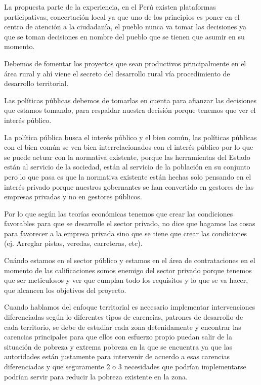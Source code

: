 \documentclass[
  a4paper,
]{article}
\begin{document}
La propuesta parte de la experiencia, en el Perú existen plataformas
participativas, concertación local ya que uno de los principios es poner
en el centro de atención a la ciudadanía, el pueblo nunca va tomar las
decisiones ya que se toman decisiones en nombre del pueblo que se tienen
que asumir en su momento.

Debemos de fomentar los proyectos que sean productivos principalmente en
el área rural y ahí viene el secreto del desarrollo rural vía
procedimiento de desarrollo territorial.

Las políticas públicas debemos de tomarlas en cuenta para afianzar las
decisiones que estamos tomando, para respaldar nuestra decisión porque
tenemos que ver el interés público.

La política pública busca el interés público y el bien común, las
políticas públicas con el bien común se ven bien interrelacionados con
el interés público por lo que se puede actuar con la normativa
existente, porque las herramientas del Estado están al servicio de la
sociedad, están al servicio de la población en su conjunto pero lo que
pasa es que la normativa existente están hechas solo pensando en el
interés privado porque nuestros gobernantes se han convertido en
gestores de las empresas privadas y no en gestores públicos.

Por lo que según las teorías económicas tenemos que crear las
condiciones favorables para que se desarrolle el sector privado, no dice
que hagamos las cosas para favorecer a la empresa privada sino que se
tiene que crear las condiciones (ej. Arreglar pistas, veredas,
carreteras, etc).

Cuándo estamos en el sector público y estamos en el área de
contrataciones en el momento de las calificaciones somos enemigo del
sector privado porque tenemos que ser meticulosos y ver que cumplan todo
los requisitos y lo que se va hacer, que alcancen los objetivos del
proyecto.

Cuando hablamos del enfoque territorial es necesario implementar
intervenciones diferenciadas según lo diferentes tipos de carencias,
patrones de desarrollo de cada territorio, se debe de estudiar cada zona
detenidamente y encontrar las carencias principales para que ellos con
esfuerzo propio puedan salir de la situación de pobreza y extrema
pobreza en la que se encuentra ya que las autoridades están justamente
para intervenir de acuerdo a esas carencias diferenciadas y que
seguramente 2 o 3 necesidades que podrían implementarse podrían servir
para reducir la pobreza existente en la zona.
\end{document}
